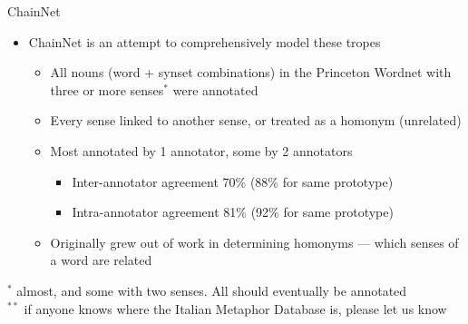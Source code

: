 \documentclass[dvipsnames]{beamer}
\begin{document}
\begin{frame}{ChainNet}

  \begin{itemize}
  \item ChainNet is an attempt to comprehensively model these tropes \citep{maudslay-etal-2024-chainnet-structured,Bond:Maudslay:2025}
    \begin{itemize}
    \item All nouns (word + synset combinations) in the
      Princeton Wordnet \citep{_Fellbaum:1998} with three or more senses$^*$
      were annotated
  \item Every sense linked to another sense, or treated as a homonym (unrelated) 
  \item Most annotated by 1 annotator, some by 2 annotators
    \begin{itemize}
    \item Inter-annotator agreement 70\% (88\% for same prototype)
    \item Intra-annotator agreement 81\% (92\% for same prototype)
    \end{itemize}
  \item Originally grew out of work in determining homonyms --- which senses of a word are related
  \end{itemize}

 
\end{itemize}

\begin{small}
 $^*$ almost, and some with two senses.   All should eventually be annotated \\
$^{**}$ if anyone knows where the Italian Metaphor Database is, please let us know
\end{small}
\end{frame}
\end{document}
